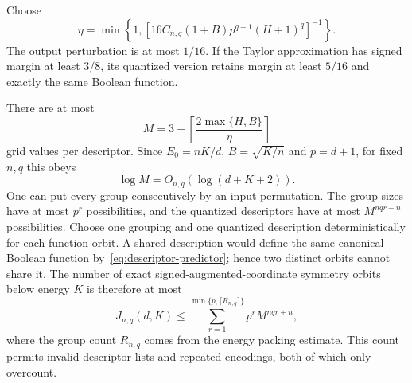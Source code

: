 Choose
\[
 \eta=\min\left\{1,
 [16C_{n,q}(1+B)p^{q+1}(H+1)^q]^{-1}\right\}.
\]
The output perturbation is at most $1/16$. If the Taylor approximation has signed margin at least $3/8$, its quantized version retains margin at least $5/16$ and exactly the same Boolean function.

There are at most
\[
 M=3+\left\lceil\frac{2\max\{H,B\}}{\eta}\right\rceil
\]
grid values per descriptor. Since $E_0=nK/d$, $B=\sqrt{K/n}$ and $p=d+1$, for fixed $n,q$ this obeys
\[
 \log M=O_{n,q}(\log(d+K+2)).
\]
One can put every group consecutively by an input permutation. The group sizes have at most $p^r$ possibilities, and the quantized descriptors have at most $M^{nqr+n}$ possibilities. Choose one grouping and one quantized description deterministically for each function orbit. A shared description would define the same canonical Boolean function by~\eqref{eq:descriptor-predictor}; hence two distinct orbits cannot share it. The number of exact signed-augmented-coordinate symmetry orbits below energy $K$ is therefore at most
\[
 J_{n,q}(d,K)\le
 \sum_{r=1}^{\min\{p,\lceil R_{n,q}\rceil\}}
      p^r M^{nqr+n},
\]
where the group count $R_{n,q}$ comes from the energy packing estimate. This count permits invalid descriptor lists and repeated encodings, both of which only overcount.
